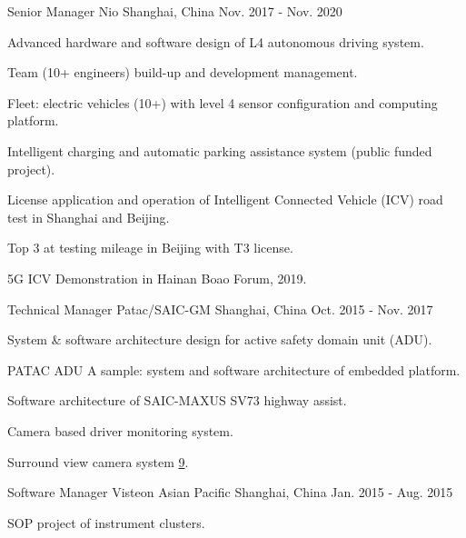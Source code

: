 \documentclass[../cv_xin.tex]{subfiles}
\begin{document}
\begin{cventries}
  \cventry
    {Senior Manager} %
    {Nio} %
    {Shanghai, China} %
    {Nov. 2017 - Nov. 2020} %
    {
      \begin{cvitems}
        \item Advanced hardware and software design of L4 autonomous driving system.
        \item Team (10+ engineers) build-up and development management.
        \item Fleet: electric vehicles (10+) with level 4 sensor configuration and computing platform.
        \item Intelligent charging and automatic parking assistance system (public funded project).
        \item License application and operation of Intelligent Connected Vehicle (ICV) road test in Shanghai and Beijing.
        \item Top 3 at testing mileage in Beijing with T3 license.
        \item 5G ICV Demonstration in Hainan Boao Forum, 2019.
      \end{cvitems}
    }

  \cventry
    {Technical Manager} %
    {Patac/SAIC-GM} %
    {Shanghai, China} %
    {Oct. 2015 - Nov. 2017} %
    {
      \begin{cvitems}
        \item System \& software architecture design for active safety domain unit (ADU).
        \item PATAC ADU A sample: system and software architecture of embedded platform.
        \item Software architecture of SAIC-MAXUS SV73 highway assist.
        \item Camera based driver monitoring system.
        \item Surround view camera system \hyperlink{Xin_RearView_17}{9}.
      \end{cvitems}
    }


  \cventry
    {Software Manager} %
    {Visteon Asian Pacific} %
    {Shanghai, China} %
    {Jan. 2015 - Aug. 2015} %
    {
      \begin{cvitems}
        \item SOP project of instrument clusters.
      \end{cvitems}
    }


\end{cventries}
\end{document}
